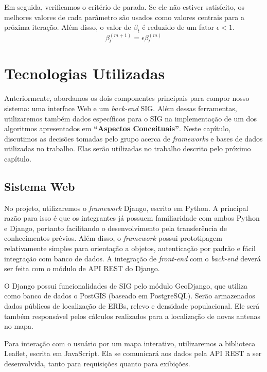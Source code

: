 \documentclass[]{politex}
\begin{document}
Em seguida, verificamos o critério de parada. Se ele não estiver satisfeito, os
melhores valores de cada parâmetro são usados como valores centrais para a
próxima iteração. Além disso, o valor de $\beta_t$ é reduzido de um fator $\epsilon < 1$.
\begin{equation*}
    \beta_t^{(m+1)} = \epsilon\beta_t^{(m)}
\end{equation*}

\chapter{Tecnologias Utilizadas}

Anteriormente, abordamos os dois componentes principais para compor nosso
sistema: uma interface Web e um \textit{back-end} SIG. Além dessas ferramentas, utilizaremos
também dados específicos para o SIG na implementação de um dos algoritmos
apresentados em \textbf{``Aspectos Conceituais''}. Neste capítulo, discutimos as
decisões tomadas pelo grupo acerca de \emph{frameworks} e bases de dados
utilizadas no trabalho. Elas serão utilizadas no trabalho descrito pelo próximo
capítulo.

\section{Sistema Web}

No projeto, utilizaremos o \textit{framework} Django, escrito em Python. A
principal razão para isso é que os integrantes já possuem familiaridade com
ambos Python e Django, portanto facilitando o desenvolvimento pela transferência
de conhecimentos prévios. Além disso, o \textit{framework} possui prototipagem
relativamente simples para orientação a objetos, autenticação por padrão e fácil
integração com banco de dados. A integração de \textit{front-end} com o
\textit{back-end} deverá ser feita com o módulo de API REST do Django.

O Django possui funcionalidades de SIG pelo módulo GeoDjango, que utiliza como
banco de dados o PostGIS (baseado em PostgreSQL). Serão armazenados
dados públicos de localização de ERBs, relevo e densidade populacional. Ele
será também responsável pelos cálculos realizados para a localização de novas
antenas no mapa.

Para interação com o usuário por um mapa interativo, utilizaremos a biblioteca
Leaflet, escrita em JavaScript. Ela se comunicará aos dados pela API REST a ser
desenvolvida, tanto para requisições quanto para exibições.
\end{document}
